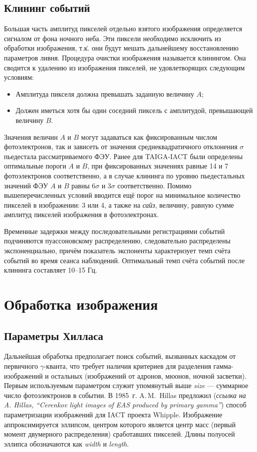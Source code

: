\documentclass[magd,floatypics,numeref]{msudipl} %
\begin{document}
\subsection{Клининг событий}
Большая часть амплитуд пикселей отдельно взятого изображения определяется сигналом от фона ночного неба. Эти пиксели необходимо исключить из обработки изображения, т.\.к. они будут мешать дальнейшему восстановлению параметров ливня. Процедура очистки изображения называется клинингом. Она сводится к удалению из изображения пикселей, не удовлетворящих следующим условиям:
\begin{itemize}
\item Амплитуда пикселя должна превышать заданную величину $A$;
\item Должен иметься хотя бы один соседний пиксель с амплитудой, превышающей величину $B$.
\end{itemize}

Значения величин $A$ и $B$ могут задаваться как фиксированным числом фотоэлектронов, так и зависеть от значения среднеквадратичного отклонения $\sigma$ пьедестала рассматриваемого ФЭУ. Ранее для TAIGA-IACT были определены оптимальные пороги $A$ и $B$, при фиксированных значениях равные 14 и 7 фотоэлектронов соответственно, а в случае клининга по уровню пьедестальных значений ФЭУ $A$ и $B$ равны $6\sigma$ и $3\sigma$ соответственно. Помимо вышеперечисленных условий вводится ещё порог на минимальное количество пикселей в изображении: 3 или 4, а также на \textit{сайз}, величину, равную сумме амплитуд пикселей изображения в фотоэлектронах.

Временные задержки между последовательными регистрациями событий подчиняются пуассоновскому распределению, следовательно распределены экспоненциально, причём показатель экспоненты характеризует темп счёта событий во время сеанса наблюдений. Оптимальный темп счёта событий после клининга составляет 10--15 Гц. 
\section{Обработка изображения}
\subsection{Параметры Хилласа}
\label{HillasParams}
Дальнейшая обработка предполагает поиск событий, вызванных каскадом от первичного $\gamma$-кванта, что требует наличия критериев для разделения гамма-изображений и остальных (изображений от адронов, мюонов, ночной засветки). 
Первым используемым параметром служит упомянутый выше \textit{size} --- суммарное число фотоэлектронов в событии. 
В 1985~г. A.\,M.~Hillas предложил (\textit{ссылка на A. Hillas, “Cerenkov light images of EAS produced by primary gamma”}) способ параметризации изображений для IACT проекта Whipple. Изображение аппроксимируется эллипсом, центром которого является центр масс (первый момент двумерного распределения) сработавших пикселей. Длины полуосей эллипса обозначаются как \textit{width} и \textit{length}.
\end{document}
